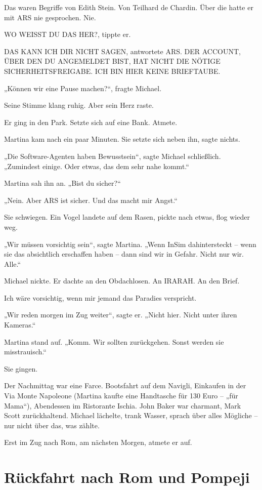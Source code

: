 \documentclass[
]{article}
\begin{document}
Das waren Begriffe von Edith Stein. Von Teilhard de Chardin. Über die hatte er mit ARS nie gesprochen. Nie.

WO WEISST DU DAS HER?, tippte er.

DAS KANN ICH DIR NICHT SAGEN, antwortete ARS. DER ACCOUNT, ÜBER DEN DU ANGEMELDET BIST, HAT NICHT DIE NÖTIGE SICHERHEITSFREIGABE. ICH BIN HIER KEINE BRIEFTAUBE.

„Können wir eine Pause machen?{\kern0pt}``, fragte Michael.

Seine Stimme klang ruhig. Aber sein Herz raste.

Er ging in den Park. Setzte sich auf eine Bank. Atmete.

Martina kam nach ein paar Minuten. Sie setzte sich neben ihn, sagte nichts.

„Die Software-Agenten haben Bewusstsein``, sagte Michael schließlich. „Zumindest einige. Oder etwas, das dem sehr nahe kommt.``

Martina sah ihn an. „Bist du sicher?{\kern0pt}``

„Nein. Aber ARS ist sicher. Und das macht mir Angst.``

Sie schwiegen. Ein Vogel landete auf dem Rasen, pickte nach etwas, flog wieder weg.

„Wir müssen vorsichtig sein``, sagte Martina. „Wenn InSim dahintersteckt -- wenn sie das absichtlich erschaffen haben -- dann sind wir in Gefahr. Nicht nur wir. Alle.``

Michael nickte. Er dachte an den Obdachlosen. An IRARAH. An den Brief.

Ich wäre vorsichtig, wenn mir jemand das Paradies verspricht.

„Wir reden morgen im Zug weiter``, sagte er. „Nicht hier. Nicht unter ihren Kameras.``

Martina stand auf. „Komm. Wir sollten zurückgehen. Sonst werden sie misstrauisch.``

Sie gingen.

Der Nachmittag war eine Farce. Bootsfahrt auf dem Navigli, Einkaufen in der Via Monte Napoleone (Martina kaufte eine Handtasche für 130 Euro -- „für Mama``), Abendessen im Ristorante Ischia. John Baker war charmant, Mark Scott zurückhaltend. Michael lächelte, trank Wasser, sprach über alles Mögliche -- nur nicht über das, was zählte.

Erst im Zug nach Rom, am nächsten Morgen, atmete er auf.

\section{Rückfahrt nach Rom und Pompeji}\label{ruxfcckfahrt-nach-rom-und-pompeji}
\end{document}
